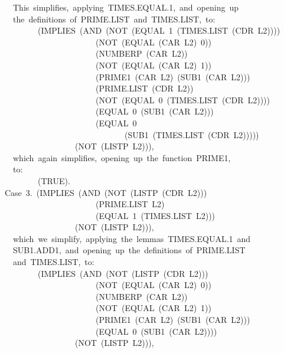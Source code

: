 \documentclass[11pt]{book}
\newenvironment{pubasis}{\begin{flushleft}\ttfamily\small}{\normalsize\rmfamily\end{flushleft}}
\begin{document}
\begin{pubasis}
~~This~simplifies,~applying~TIMES.EQUAL.1,~and~opening~up\\
~~the~definitions~of~PRIME.LIST~and~TIMES.LIST,~to:\\

~~~~~~~~(IMPLIES~(AND~(NOT~(EQUAL~1~(TIMES.LIST~(CDR~L2))))\\
~~~~~~~~~~~~~~~~~~~~~~(NOT~(EQUAL~(CAR~L2)~0))\\
~~~~~~~~~~~~~~~~~~~~~~(NUMBERP~(CAR~L2))\\
~~~~~~~~~~~~~~~~~~~~~~(NOT~(EQUAL~(CAR~L2)~1))\\
~~~~~~~~~~~~~~~~~~~~~~(PRIME1~(CAR~L2)~(SUB1~(CAR~L2)))\\
~~~~~~~~~~~~~~~~~~~~~~(PRIME.LIST~(CDR~L2))\\
~~~~~~~~~~~~~~~~~~~~~~(NOT~(EQUAL~0~(TIMES.LIST~(CDR~L2))))\\
~~~~~~~~~~~~~~~~~~~~~~(EQUAL~0~(SUB1~(CAR~L2)))\\
~~~~~~~~~~~~~~~~~~~~~~(EQUAL~0\\
~~~~~~~~~~~~~~~~~~~~~~~~~~~~~(SUB1~(TIMES.LIST~(CDR~L2)))))\\
~~~~~~~~~~~~~~~~~(NOT~(LISTP~L2))),\\

~~which~again~simplifies,~opening~up~the~function~PRIME1,\\
~~to:\\

~~~~~~~~(TRUE).\\

Case~3.~(IMPLIES~(AND~(NOT~(LISTP~(CDR~L2)))\\
~~~~~~~~~~~~~~~~~~~~~~(PRIME.LIST~L2)\\
~~~~~~~~~~~~~~~~~~~~~~(EQUAL~1~(TIMES.LIST~L2)))\\
~~~~~~~~~~~~~~~~~(NOT~(LISTP~L2))),\\

~~which~we~simplify,~applying~the~lemmas~TIMES.EQUAL.1~and\\
~~SUB1.ADD1,~and~opening~up~the~definitions~of~PRIME.LIST\\
~~and~TIMES.LIST,~to:\\

~~~~~~~~(IMPLIES~(AND~(NOT~(LISTP~(CDR~L2)))\\
~~~~~~~~~~~~~~~~~~~~~~(NOT~(EQUAL~(CAR~L2)~0))\\
~~~~~~~~~~~~~~~~~~~~~~(NUMBERP~(CAR~L2))\\
~~~~~~~~~~~~~~~~~~~~~~(NOT~(EQUAL~(CAR~L2)~1))\\
~~~~~~~~~~~~~~~~~~~~~~(PRIME1~(CAR~L2)~(SUB1~(CAR~L2)))\\
~~~~~~~~~~~~~~~~~~~~~~(EQUAL~0~(SUB1~(CAR~L2))))\\
~~~~~~~~~~~~~~~~~(NOT~(LISTP~L2))),\\


\end{pubasis}
\end{document}
